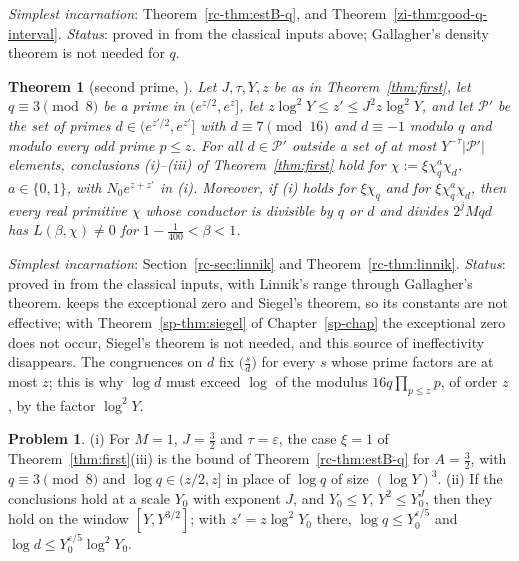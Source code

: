 \documentclass[reqno]{amsart}
\newcounter{chap}
\theoremstyle{definition}
\newtheorem{problem}{Problem}[section]
\theoremstyle{plain}
\newtheorem{theorem}{Theorem}[section]
\begin{document}
\noindent\emph{Simplest incarnation}: Theorem~\ref{rc-thm:estB-q}, and Theorem~\ref{zi-thm:good-q-interval}.  \emph{Status}: proved in \cite{Adr} from the classical inputs above; Gallagher's density theorem is not needed for \(q\).

\begin{theorem}[second prime, {\cite[Thm.~5.12 and Cor.~5.13]{Adr}}]\label{thm:second}
Let \(J, \tau, Y, z\) be as in Theorem~\ref{thm:first}, let \(q \equiv 3 \pmod 8\) be a prime in \((e^{z/2}, e^z]\), let \(z\log^2Y \le z' \le J^2z\log^2Y\), and let \(\mathcal{P}'\) be the set of primes \(d \in (e^{z'/2}, e^{z'}]\) with \(d \equiv 7 \pmod{16}\) and \(d \equiv -1\) modulo \(q\) and modulo every odd prime \(p \le z\).  For all \(d \in \mathcal{P}'\) outside a set of at most \(Y^{-\tau}\lvert\mathcal{P}'\rvert\) elements, conclusions (i)--(iii) of Theorem~\ref{thm:first} hold for \(\chi := \xi\chi_q^a\chi_d\), \(a \in \{0,1\}\), with \(N_0e^{z+z'}\) in (i).  Moreover, if (i) holds for \(\xi\chi_q\) and for \(\xi\chi_q^a\chi_d\), then every real primitive \(\chi\) whose conductor is divisible by \(q\) or \(d\) and divides \(2^jMqd\) has \(L(\beta,\chi) \ne 0\) for \(1 - \frac1{400} < \beta < 1\).
\end{theorem}

\noindent\emph{Simplest incarnation}: Section~\ref{rc-sec:linnik} and Theorem~\ref{rc-thm:linnik}.  \emph{Status}: proved in \cite{Adr} from the classical inputs, with Linnik's range through Gallagher's theorem.  \cite{Adr} keeps the exceptional zero and Siegel's theorem, so its constants are not effective; with Theorem~\ref{sp-thm:siegel} of Chapter~\ref{sp-chap} the exceptional zero does not occur, Siegel's theorem is not needed, and this source of ineffectivity disappears.  The congruences on \(d\) fix \(\bigl(\frac sd\bigr)\) for every \(s\) whose prime factors are at most \(z\); this is why \(\log d\) must exceed \(\log\) of the modulus \(16q\prod_{p\le z}p\), of order \(z\), by the factor \(\log^2Y\).

\begin{problem}\label{pr:estB-base}
(i) For \(M = 1\), \(J = \frac32\) and \(\tau = \varepsilon\), the case \(\xi = 1\) of Theorem~\ref{thm:first}(iii) is the bound of Theorem~\ref{rc-thm:estB-q} for \(A = \frac32\), with \(q \equiv 3 \pmod 8\) and \(\log q \in (z/2, z]\) in place of \(\log q\) of size \((\log Y)^3\).
(ii) If the conclusions hold at a scale \(Y_0\) with exponent \(J\), and \(Y_0 \le Y\), \(Y^2 \le Y_0^J\), then they hold on the window \([Y, Y^{3/2}]\); with \(z' = z\log^2Y_0\) there, \(\log q \le Y_0^{\varepsilon/5}\) and \(\log d \le Y_0^{\varepsilon/5}\log^2Y_0\).
\end{problem}
\end{document}
